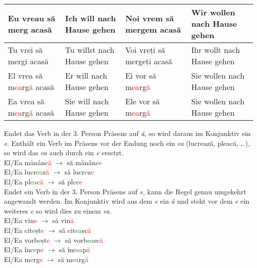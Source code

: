 \documentclass[11pt, oneside]{article}
\begin{document}
\begin{center}
  \begin{tabular}{ |p{3.25cm}|p{3.25cm}||p{3.25cm}|p{3.25cm}|  }
      \hline
      Eu vreau să merg acasă & Ich will nach Hause gehen & Noi vrem să mergem acasă & Wir wollen nach Hause gehen\\
      \hline
      Tu vrei să mergi acasă & Tu willst nach Hause gehen & Voi vreți să mergeți acasă & Ihr wollt nach Hause gehen\\
      \hline
      El vrea să m\textcolor{Red}{ea}rg\textcolor{Red}{ă} acasă & Er will nach Hause gehen & Ei vor să m\textcolor{Red}{ea}rg\textcolor{Red}{ă} & Sie wollen nach Hause gehen\\ 
      Ea vrea să m\textcolor{Red}{ea}rg\textcolor{Red}{ă} acasă & Sie will nach Hause gehen & Ele vor să m\textcolor{Red}{ea}rg\textcolor{Red}{ă} & Sie wollen nach Hause gehen\\
      \hline
     \end{tabular}
\end{center}
Endet das Verb in der 3. Person Präsens auf \emph{ă}, so wird daraus im Konjunktiv 
ein \emph{e}. Enthält ein Verb im Präsens vor der Endung noch ein \emph{ea} 
(lucrează, pleacă, \dots), so wird das \emph{ea} auch durch ein \emph{e} ersetzt.\\
\newline
El/Ea mănânc\textcolor{Red}{ă} $\rightarrow$ să mănânc\textcolor{Red}{e}\\
El/Ea lucr\textcolor{Green}{ea}z\textcolor{Red}{ă} $\rightarrow$ să lucr\textcolor{Green}{e}z\textcolor{Red}{e}\\
El/Ea pl\textcolor{Green}{ea}c\textcolor{Red}{ă} $\rightarrow$ să pl\textcolor{Green}{e}c\textcolor{Red}{e}\\
\newline
Endet ein Verb in der 3. Person Präsens auf \emph{e}, kann die Regel genau umgekehrt 
angewandt werden. Im Konjunktiv wird aus dem \emph{e} ein \emph{ă} und steht vor dem 
\emph{e} ein weiteres \emph{e} so wird dies zu einem \emph{ea}.\\
\newline
El/Ea vin\textcolor{Red}{e} $\rightarrow$ să vin\textcolor{Red}{ă}\\
El/Ea cit\textcolor{Green}{e}șt\textcolor{Red}{e} $\rightarrow$ să cit\textcolor{Green}{ea}sc\textcolor{Red}{ă}\\
El/Ea vorb\textcolor{Green}{e}șt\textcolor{Red}{e} $\rightarrow$ să vorb\textcolor{Green}{ea}sc\textcolor{Red}{ă}\\
El/Ea înc\textcolor{Green}{e}p\textcolor{Red}{e} $\rightarrow$ să înc\textcolor{Green}{ea}p\textcolor{Red}{ă}\\
El/Ea m\textcolor{Green}{e}rg\textcolor{Red}{e} $\rightarrow$ să m\textcolor{Green}{ea}rg\textcolor{Red}{ă}
%
\end{document}

